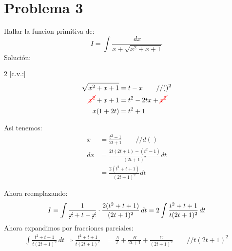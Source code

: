 \section{Problema 3}
    Hallar la funcion primitiva de:
    \begin{equation*}
        I=\int\frac{dx}{x+\sqrt{x^2+x+1}}
    \end{equation*}
    Solución:\\

    \begin{multicols}{2}
        [c.v.:]
        \begin{align*}
            \sqrt{x^2+x+1}&=t-x\qquad //()^2 \\
            \textcolor{red}{\cancel{x^2}}+x+1&=t^2-2tx+\textcolor{red}{\cancel{x^2}} \\
            x(1+2t)&=t^2+1\\
        \end{align*}
        \columnbreak
        
        Asi tenemos:
        \begin{align*}
            x&=\frac{t^2-1}{2t+1}\qquad//d()\\
            dx&=\frac{2t\left(2t+1\right)-\left(t^2-1\right)}{(2t+1)^2}dt\\
            &= \frac{2(t^2+t+1)}{(2t+1)^2}dt
        \end{align*}
    \end{multicols}        
    Ahora reemplazando:
    \begin{equation*}
        I=\int\frac{1}{\cancel{x}+t-\cancel{x}}\cdot \frac{2(t^2+t+1)}{(2t+1)^2}\,dt = 
        2\int\frac{t^2+t+1}{t(2t+1)^2}\,dt
    \end{equation*}
    Ahora expandimos por fracciones parciales:
    \begin{align*}
        \int\frac{t^2+t+1}{t(2t+1)^2}\,dt\Rightarrow \frac{t^2+t+1}{t(2t+1)^2}&=\frac{A}{t}+\frac{B}{2t+1}+\frac{C}{(2t+1)^2}\qquad//t(2t+1)^2
    \end{align*}

